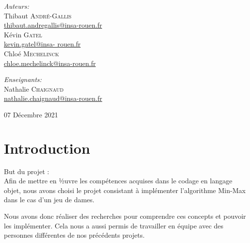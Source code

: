 \documentclass[12,french]{report}
\begin{document}
\begin{titlepage}
\begin{center}
	\begin{minipage}{0.4\textwidth}
		\begin{flushleft} \large
			\emph{Auteurs:}\\
			Thibaut \textsc{André-Gallis} \\
			{\small\href{mailto:thibaut.andregallis@insa-rouen.fr}{thibaut.andregallis@insa-rouen.fr}} \\
			Kévin \textsc{Gatel} \\
			{\small\href{mailto:kevin.gatel@insa-rouen.fr}{kevin.gatel@insa-				rouen.fr}}\\
			Chloé \textsc{Mechelinck} \\
			{\small\href{mailto:chloe.mechelinck@insa-rouen.fr}{chloe.mechelinck@insa-rouen.fr}}
		\end{flushleft}
	\end{minipage}
	\begin{minipage}{0.4\textwidth}
		\begin{flushright} \large
			\emph{Enseignants:} \\
			Nathalie \textsc{Chaignaud} \\
			{\small\href{mailto:nathalie.chaignaud@insa-rouen.fr}								{nathalie.chaignaud@insa-rouen.fr}}\\
		\end{flushright}
	\end{minipage}

	\vfill
	{\large 07 Décembre 2021}
\end{center}
\end{titlepage}

\tableofcontents


\renewcommand{\chaptername}{}

\chapter*{Introduction}

But du projet : \\

Afin de mettre en ½uvre les compétences acquises dans le codage en
langage objet, nous avons choisi le projet consistant à implémenter
l'algorithme Min-Max dans le cas d'un jeu de dames.

Nous avons donc réaliser des recherches pour comprendre ces concepts
et pouvoir les implémenter. Cela nous a aussi permis de travailler
en équipe avec des personnes différentes de nos précédents projets.
\end{document}
